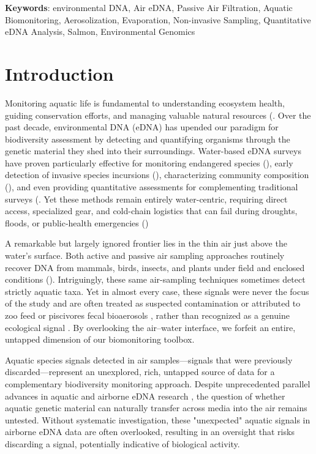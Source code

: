 \documentclass{article}
\begin{document}
\textbf{Keywords}: environmental DNA, Air eDNA, Passive Air Filtration, Aquatic Biomonitoring, Aerosolization, Evaporation, Non-invasive Sampling, Quantitative eDNA Analysis, Salmon, Environmental Genomics

\section{Introduction}
Monitoring aquatic life is fundamental to understanding ecosystem health, guiding conservation efforts, and managing valuable natural resources (\cite{dudgeon2006,reid2019}. Over the past decade, environmental DNA (eDNA) has upended our paradigm for biodiversity assessment by detecting and quantifying organisms through the genetic material they shed into their surroundings. Water-based eDNA surveys have proven particularly effective for monitoring endangered species (\cite{biggs2015}), early detection of invasive species incursions (\cite{thomas2020}), characterizing community composition (\cite{wilkinson2024}), and even providing quantitative assessments for complementing traditional surveys (\cite{allan2023,guri2024a,tillotson2018}. Yet these methods remain entirely water-centric, requiring direct access, specialized gear, and cold-chain logistics that can fail during droughts, floods, or public-health emergencies (\cite{chen2024, ruiz-ramos2023, wan2023})

A remarkable but largely ignored frontier lies in the thin air just above the water’s surface. Both active and passive air sampling approaches routinely recover DNA from mammals, birds, insects, and plants under field and enclosed conditions (\cite{clare2021, garrett2023, johnson2019, johnson2023, lynggaard2024, roger2022, lynggaard2022}). Intriguingly, these same air-sampling techniques sometimes detect strictly aquatic taxa. Yet in almost every case, these signals were never the focus of the study and are often treated as suspected contamination or attributed to zoo feed or piscivores fecal bioaerosols \cite{sullivan2023, klepke2022, lynggaard2023, lynggaard2022}, rather than recognized as a genuine ecological signal \cite{tournayre2025}. By overlooking the air–water interface, we forfeit an entire, untapped dimension of our biomonitoring toolbox.

Aquatic species signals detected in air samples—signals that were previously discarded—represent an unexplored, rich, untapped source of data for a complementary biodiversity monitoring approach. Despite unprecedented parallel advances in aquatic and airborne eDNA research \cite{altermatt2025, klepke2022, johnson2024, lynggaard2023}, the question of whether aquatic genetic material can naturally transfer across media into the air remains untested. Without systematic investigation, these "unexpected" aquatic signals in airborne eDNA data are often overlooked, resulting in an oversight that risks discarding a signal, potentially indicative of biological activity. 
\end{document}
